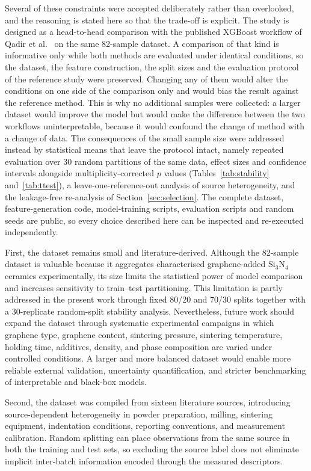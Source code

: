 \documentclass[pdflatex,sn-mathphys-num]{sn-jnl}%
\newif\ifrevmarks%
\newcommand{\revmark}[1]{\ifrevmarks\textcolor{revblue}{#1}\else#1\fi}%
\theoremstyle{thmstyleone}%
\theoremstyle{thmstyletwo}%
\theoremstyle{thmstylethree}%
\begin{document}
\revmark{Several of these constraints were accepted deliberately rather than overlooked, and the reasoning is stated here so that the trade-off is explicit. The study is designed as a head-to-head comparison with the published XGBoost workflow of Qadir et al.~\cite{qadir2024predicting} on the same 82-sample dataset. A comparison of that kind is informative only while both methods are evaluated under identical conditions, so the dataset, the feature construction, the split sizes and the evaluation protocol of the reference study were preserved. Changing any of them would alter the conditions on one side of the comparison only and would bias the result against the reference method. This is why no additional samples were collected: a larger dataset would improve the model but would make the difference between the two workflows uninterpretable, because it would confound the change of method with a change of data. The consequences of the small sample size were addressed instead by statistical means that leave the protocol intact, namely repeated evaluation over 30 random partitions of the same data, effect sizes and confidence intervals alongside multiplicity-corrected $p$ values (Tables~\ref{tab:stability} and~\ref{tab:ttest}), a leave-one-reference-out analysis of source heterogeneity, and the leakage-free re-analysis of Section~\ref{sec:selection}. The complete dataset, feature-generation code, model-training scripts, evaluation scripts and random seeds are public, so every choice described here can be inspected and re-executed independently.}

First, the dataset remains small and literature-derived. Although the 82-sample dataset is valuable because it aggregates characterised graphene-added Si$_3$N$_4$ ceramics experimentally, its size limits the statistical power of model comparison and increases sensitivity to train--test partitioning. This limitation is partly addressed in the present work through fixed 80/20 and 70/30 splits together with a 30-replicate random-split stability analysis. Nevertheless, future work should expand the dataset through systematic experimental campaigns in which graphene type, graphene content, sintering pressure, sintering temperature, holding time, additives, density, and phase composition are varied under controlled conditions. A larger and more balanced dataset would enable more reliable external validation, uncertainty quantification, and stricter benchmarking of interpretable and black-box models.

Second, the dataset was compiled from sixteen literature sources, introducing source-dependent heterogeneity in powder preparation, milling, sintering equipment, indentation conditions, reporting conventions, and measurement calibration. Random splitting can place observations from the same source in both the training and test sets, so excluding the source label does not eliminate implicit inter-batch information encoded through the measured descriptors.
\end{document}

